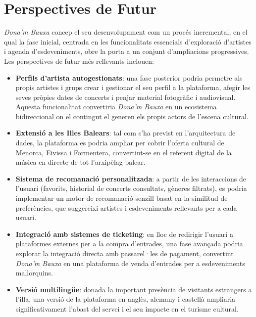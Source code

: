 \section{Perspectives de Futur}

\textit{Dona'm Bauxa} concep el seu desenvolupament com un procés incremental, en el qual la fase inicial, centrada en les funcionalitats essencials d'exploració d'artistes i agenda d'esdeveniments, obre la porta a un conjunt d'ampliacions progressives. Les perspectives de futur més rellevants inclouen:

\begin{itemize}
    \item \textbf{Perfils d'artista autogestionats}: una fase posterior podria permetre als propis artistes i grups crear i gestionar el seu perfil a la plataforma, afegir les seves pròpies dates de concerts i penjar material fotogràfic i audiovisual. Aquesta funcionalitat convertiria \textit{Dona'm Bauxa} en un ecosistema bidireccional on el contingut el generen els propis actors de l'escena cultural.

    \item \textbf{Extensió a les Illes Balears}: tal com s'ha previst en l'arquitectura de dades, la plataforma es podria ampliar per cobrir l'oferta cultural de Menorca, Eivissa i Formentera, convertint-se en el referent digital de la música en directe de tot l'arxipèlag balear.

    \item \textbf{Sistema de recomanació personalitzada}: a partir de les interaccions de l'usuari (favorits, historial de concerts consultats, gèneres filtrats), es podria implementar un motor de recomanació senzill basat en la similitud de preferències, que suggereixi artistes i esdeveniments rellevants per a cada usuari.

    \item \textbf{Integració amb sistemes de ticketing}: en lloc de redirigir l'usuari a plataformes externes per a la compra d'entrades, una fase avançada podria explorar la integració directa amb passarel·les de pagament, convertint \textit{Dona'm Bauxa} en una plataforma de venda d'entrades per a esdeveniments mallorquins.

    \item \textbf{Versió multilingüe}: donada la important presència de visitants estrangers a l'illa, una versió de la plataforma en anglès, alemany i castellà ampliaria significativament l'abast del servei i el seu impacte en el turisme cultural.
\end{itemize}

